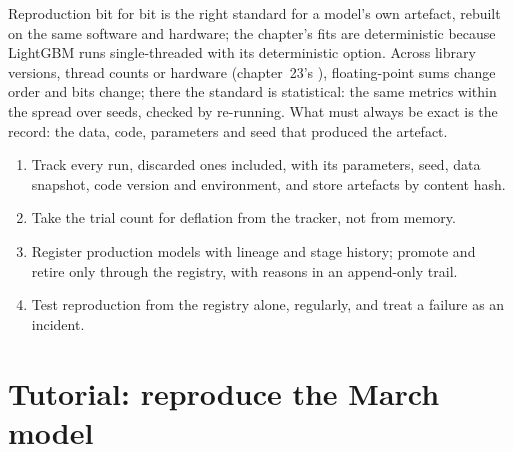Reproduction bit for bit is the right standard for a model's own artefact, rebuilt on the same software and hardware; the chapter's
fits are deterministic because LightGBM runs single-threaded with its deterministic option. Across library versions, thread
counts or hardware (chapter~23's ), floating-point sums change order and bits change; there the standard is statistical:
the same metrics within the spread over seeds, checked by re-running. What must always be exact is the record: the data, code,
parameters and seed that produced the artefact.

\begin{method}\label{met:ml:exp:method}
\begin{enumerate}
\item Track every run, discarded ones included, with its parameters, seed, data snapshot, code version and environment, and
store artefacts by content hash.
\item Take the trial count for deflation from the tracker, not from memory.
\item Register production models with lineage and stage history; promote and retire only through the registry, with reasons in
an append-only trail.
\item Test reproduction from the registry alone, regularly, and treat a failure as an incident.
\end{enumerate}
\end{method}

\section{Tutorial: reproduce the March model}\label{tut:ml:experiment-tracking-and-reproducibility:tut}

